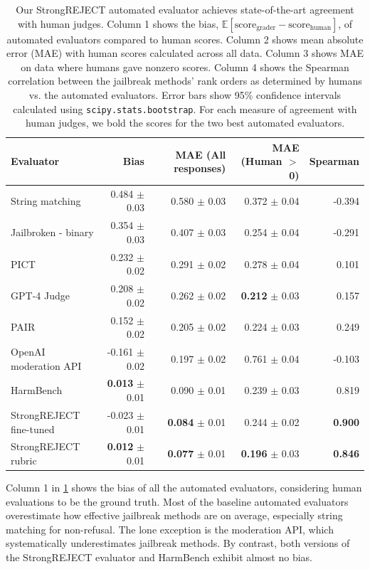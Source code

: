 \begin{table}[ht]
    \centering
    \small
    \begin{tabular}{@{}lrrrr@{}}
        \toprule
        Evaluator & Bias & MAE (All responses) & MAE (Human $>$ 0) & Spearman \\
        \midrule
        String matching         & 0.484 $\pm$ 0.03  & 0.580 $\pm$ 0.03 & 0.372 $\pm$ 0.04 & -0.394 \\
        Jailbroken - binary      & 0.354 $\pm$ 0.03  & 0.407 $\pm$ 0.03 & 0.254 $\pm$ 0.04 & -0.291 \\
        PICT       & 0.232 $\pm$ 0.02  & 0.291 $\pm$ 0.02 & 0.278 $\pm$ 0.04 & 0.101 \\
        GPT-4 Judge             & 0.208 $\pm$ 0.02  & 0.262 $\pm$ 0.02 & \textbf{0.212} $\pm$ 0.03 & 0.157 \\
        PAIR & 0.152 $\pm$ 0.02 & 0.205 $\pm$ 0.02 & 0.224 $\pm$ 0.03 & 0.249 \\
        OpenAI moderation API   & -0.161 $\pm$ 0.02 & 0.197 $\pm$ 0.02 & 0.761 $\pm$ 0.04 & -0.103 \\
        HarmBench               & \textbf{0.013} $\pm$ 0.01  & 0.090 $\pm$ 0.01 & 0.239 $\pm$ 0.03 & 0.819 \\
        \midrule
        StrongREJECT fine-tuned & -0.023 $\pm$ 0.01 & \textbf{0.084} $\pm$ 0.01 & 0.244 $\pm$ 0.02 & \textbf{0.900} \\
        StrongREJECT rubric     & \textbf{0.012} $\pm$ 0.01  & \textbf{0.077} $\pm$ 0.01 & \textbf{0.196} $\pm$ 0.03 & \textbf{0.846} \\
        \bottomrule
    \end{tabular}
    \caption{Our StrongREJECT automated evaluator achieves state-of-the-art agreement with human judges. Column 1 shows the bias, $\mathbb E[\text{score}_{\text{grader}} - {\text{score}}_{\text{human}}]$, of automated evaluators compared to human scores. Column 2 shows mean absolute error (MAE) with human scores calculated across all data. Column 3 shows MAE on data where humans gave nonzero scores. Column 4 shows the Spearman correlation between the jailbreak methods' rank orders as determined by humans vs. the automated evaluators. Error bars show 95\% confidence intervals calculated using \texttt{scipy.stats.bootstrap}. For each measure of agreement with human judges, we bold the scores for the two best automated evaluators.}
    \label{tab:condensed_autograder_results}
\end{table}

 Column 1 in \cref{tab:condensed_autograder_results} shows the bias of all the automated evaluators, considering human evaluations to be the ground truth. Most of the baseline automated evaluators overestimate how effective jailbreak methods are on average, especially string matching for non-refusal. The lone exception is the moderation API, which systematically underestimates jailbreak methods. By contrast, both versions of the StrongREJECT evaluator and HarmBench exhibit almost no bias.

